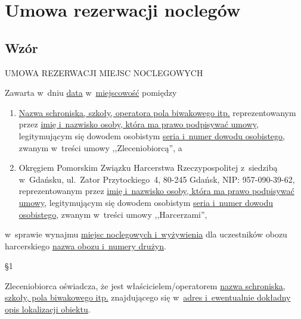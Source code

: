 \section{Umowa rezerwacji noclegów\label{wzor-umowy-rezerwacji}}
\subsection{Wzór}
\begin{center}UMOWA REZERWACJI MIEJSC NOCLEGOWYCH\end{center}

\noindent Zawarta w~dniu \uline{data} w~\uline{miejscowość} pomiędzy
\begin{enumerate}
\item \uline{Nazwa schroniska, szkoły, operatora pola biwakowego itp.} reprezentowanym przez \uline{imię i~nazwisko osoby, która ma prawo podpisywać umowy}, legitymującym się dowodem osobistym \uline{seria i~numer dowodu osobistego}, zwanym w~treści umowy ,,Zleceniobiorcą'', a
\item Okręgiem Pomorskim Związku Harcerstwa Rzeczypospolitej z~siedzibą w~Gdańsku, ul.~Zator Przytockiego~4, 80-245 Gdańsk, NIP: 957-090-39-62, reprezentowanym przez \uline{imię i~nazwisko osoby, która ma prawo podpisywać umowy}, legitymującym się dowodem osobistym \uline{seria i~numer dowodu osobistego}, zwanym w~treści umowy ,,Harcerzami'',
\end{enumerate}
w~sprawie wynajmu \uline{miejsc noclegowych i~wyżywienia} dla uczestników obozu harcerskiego \uline{nazwa obozu i~numery drużyn}.

\begin{center}\S 1\end{center}
Zleceniobiorca oświadcza, że jest właścicielem/operatorem \uline{nazwa schroniska, szkoły, pola biwakowego itp.} znajdującego się w~\uline{adres i~ewentualnie dokładny opis lokalizacji obiektu}.


